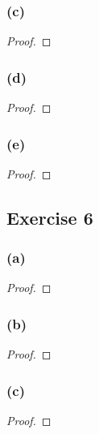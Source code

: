 \documentclass[14pt]{extarticle}
\begin{document}
\subsubsection{(c)}

\begin{proof}

\end{proof}

\subsubsection{(d)}

\begin{proof}

\end{proof}

\subsubsection{(e)}

\begin{proof}

\end{proof}

\subsection{Exercise 6}

\subsubsection{(a)}

\begin{proof}

\end{proof}

\subsubsection{(b)}

\begin{proof}

\end{proof}

\subsubsection{(c)}

\begin{proof}

\end{proof}
\end{document}
